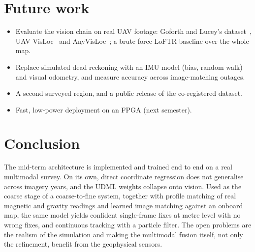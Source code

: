 \documentclass[11pt,a4paper]{article}
\begin{document}
\section{Future work}\label{sec:future}
\begin{itemize}
\item Evaluate the vision chain on real UAV footage: Goforth and Lucey's dataset~\cite{goforth2019gps},
UAV-VisLoc~\cite{uavvisloc2024} and AnyVisLoc~\cite{anyvisloc2025}; a brute-force LoFTR baseline over the
whole map.
\item Replace simulated dead reckoning with an IMU model (bias, random walk) and visual odometry, and
measure accuracy across image-matching outages.
\item A second surveyed region, and a public release of the co-registered dataset.
\item Fast, low-power deployment on an FPGA (next semester).
\end{itemize}

\section{Conclusion}
The mid-term architecture is implemented and trained end to end on a real multimodal survey. On its
own, direct coordinate regression does not generalise across imagery years, and the UDML weights
collapse onto vision. Used as the coarse stage of a coarse-to-fine system, together with profile
matching of real magnetic and gravity readings and learned image matching against an onboard map, the
same model yields confident single-frame fixes at metre level with no wrong fixes, and continuous
tracking with a particle filter. The open problems are the realism of the simulation and making the
multimodal fusion itself, not only the refinement, benefit from the geophysical sensors.



\end{document}
